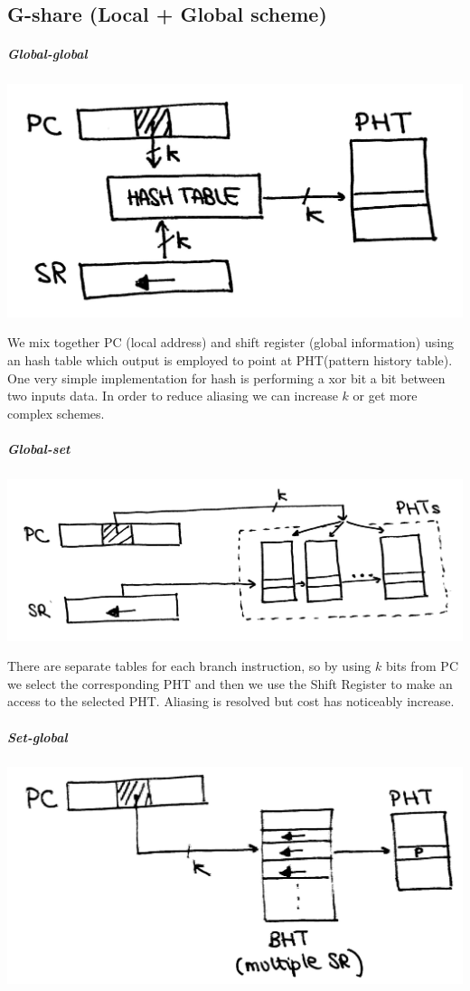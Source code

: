 \subsection{G-share (Local + Global scheme)}
\subparagraph{Global-global}
\begin{center}
  \includegraphics[width=0.6\linewidth]{img/img3/20}
\end{center}
We mix together PC (local address) and shift register (global information)
using an hash table which output is employed to point at PHT(pattern history
table). One very simple implementation for hash is performing a xor bit a bit
between two inputs data.  In order to reduce aliasing we can increase $k$ or
get more complex schemes.
\newpage
\subparagraph{Global-set}
\begin{center}
  \includegraphics[width=0.7\linewidth]{img/img3/21}
\end{center}
There are separate tables for each branch instruction, so by using $k$ bits
from PC we select the corresponding PHT and then we use the Shift Register to
make an access to the selected PHT. Aliasing is resolved but cost has
noticeably increase.
\subparagraph{Set-global}
\begin{center}
  \includegraphics[width=0.7\linewidth]{img/img3/22}
\end{center}
